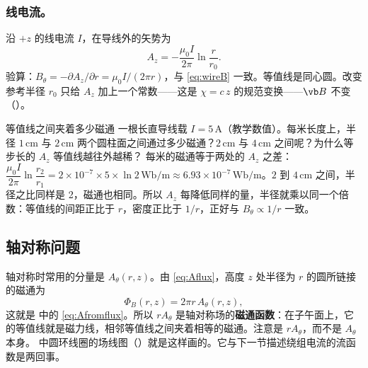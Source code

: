 \subsubsection{线电流。} 沿 $+z$ 的线电流 $I$，在导线外的矢势为
\begin{equation}
A_z=-\frac{\mu_0I}{2\pi}\ln\frac{r}{r_0}.
\end{equation}
验算：$B_\theta=-\partial A_z/\partial r=\mu_0I/(2\pi r)$，与 \eqref{eq:wireB} 一致。等值线是同心圆。改变参考半径 $r_0$ 只给 $A_z$ 加上一个常数——这是 $\chi=c\,z$ 的规范变换——$\vb B$ 不变（）。


\begin{example}{等值线之间夹着多少磁通}\label{ex:potentials-az}
一根长直导线载 $I=5\,\mathrm A$（教学数值）。每米长度上，半径 $1\,\mathrm{cm}$ 与 $2\,\mathrm{cm}$ 两个圆柱面之间通过多少磁通？$2\,\mathrm{cm}$ 与 $4\,\mathrm{cm}$ 之间呢？为什么等步长的 $A_z$ 等值线越往外越稀？
\solution
每米的磁通等于两处的 $A_z$ 之差：$\dfrac{\mu_0I}{2\pi}\ln\dfrac{r_2}{r_1}=2\times10^{-7}\times5\times\ln2\,\mathrm{Wb/m}\approx6.93\times10^{-7}\,\mathrm{Wb/m}$。$2$ 到 $4\,\mathrm{cm}$ 之间，半径之比同样是 2，磁通也相同。所以 $A_z$ 每降低同样的量，半径就乘以同一个倍数：等值线的间距正比于 $r$，密度正比于 $1/r$，正好与 $B_\theta\propto1/r$ 一致。
\end{example}

\subsection{轴对称问题}
轴对称时常用的分量是 $A_\theta(r,z)$。由 \eqref{eq:Aflux}，高度 $z$ 处半径为 $r$ 的圆所链接的磁通为
\begin{equation}
\Phi_B(r,z)=2\pi r\,A_\theta(r,z),
\end{equation}
这就是 中的 \eqref{eq:Afromflux}。所以 $rA_\theta$ 是轴对称场的\textbf{磁通函数}：在子午面上，它的等值线就是磁力线，相邻等值线之间夹着相等的磁通。注意是 $rA_\theta$，而不是 $A_\theta$ 本身。 中圆环线圈的场线图（）就是这样画的。它与下一节描述绕组电流的流函数是两回事。

